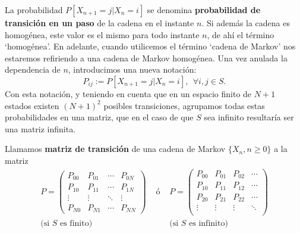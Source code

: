 La probabilidad $P[X_{n+1}=j|X_n=i]$ se denomina \textbf{probabilidad de transición en un paso} de la cadena en el instante $n$. Si además la cadena es homogénea, este valor es el mismo para todo instante $n$, de ahí el término `homogénea'. En adelante, cuando utilicemos el término `cadena de Markov' nos estaremos refiriendo a una cadena de Markov homogénea. Una vez anulada la dependencia de $n$, introducimos una nueva notación:
$$
P_{ij} := P[X_{n+1}=j|X_n=i], \ \ \forall i,j \in S.
$$
Con esta notación, y teniendo en cuenta que en un espacio finito de $N+1$ estados existen $(N+1)^2$ posibles transiciones, agrupamos todas estas probabilidades en una matriz, que en el caso de que $S$ sea infinito resultaría ser una matriz infinita.

\begin{definicion}
    Llamamos \textbf{matriz de transición} de una cadena de Markov $\{X_n, n\geq 0\}$ a la matriz
    \begin{equation}
        \label{eq:matriz-trans}
        \begin{array}{ccc}
            P=\begin{pmatrix}
                P_{00} & P_{01} & \cdots & P_{0N} \\
                P_{10} & P_{11} & \cdots & P_{1N} \\
                \vdots & \vdots & \ddots & \vdots \\
                P_{N0} & P_{N1} & \cdots & P_{NN}  
            \end{pmatrix} & \text{ ó } &
            P=\begin{pmatrix}
                P_{00} & P_{01} & P_{02} & \cdots  \\
                P_{10} & P_{11} & P_{12} & \cdots  \\
                P_{20} & P_{21} & P_{22} & \cdots  \\
                \vdots & \vdots & \vdots & \ddots  \\ 
            \end{pmatrix} \\
            \text{(si }S\text{ es finito)} & & \text{(si }S\text{ es infinito)}\\
        \end{array}
    \end{equation}
\end{definicion}


